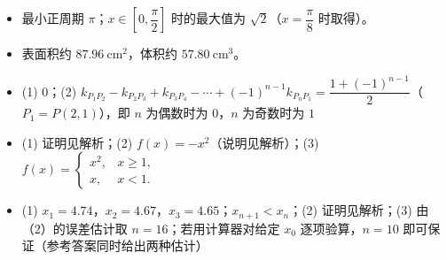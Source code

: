 \begin{itemize}[leftmargin=2.6em]
  \item[\textbf{19.}] 最小正周期 $\pi$；$x\in\left[0,\dfrac\pi2\right]$ 时的最大值为 $\sqrt2$（$x=\dfrac\pi8$ 时取得）。
  \item[\textbf{20.}] 表面积约 $87.96\ \mathrm{cm}^2$，体积约 $57.80\ \mathrm{cm}^3$。
  \item[\textbf{21.}] (1) $0$；(2) $k_{P_1P_2}-k_{P_2P_3}+k_{P_3P_4}-\cdots+(-1)^{n-1}k_{P_nP_1}=\dfrac{1+(-1)^{n-1}}2$（$P_1=P(2,1)$），即 $n$ 为偶数时为 $0$，$n$ 为奇数时为 $1$
  \item[\textbf{22.}] (1) 证明见解析；(2) $f(x)=-x^2$（说明见解析）；(3) $f(x)=\begin{cases}x^2,&x\geqslant1,\\ x,&x<1.\end{cases}$
  \item[\textbf{23.}] (1) $x_1=4.74$，$x_2=4.67$，$x_3=4.65$；$x_{n+1}<x_n$；(2) 证明见解析；(3) 由（2）的误差估计取 $n=16$；若用计算器对给定 $x_0$ 逐项验算，$n=10$ 即可保证（参考答案同时给出两种估计）
\end{itemize}
